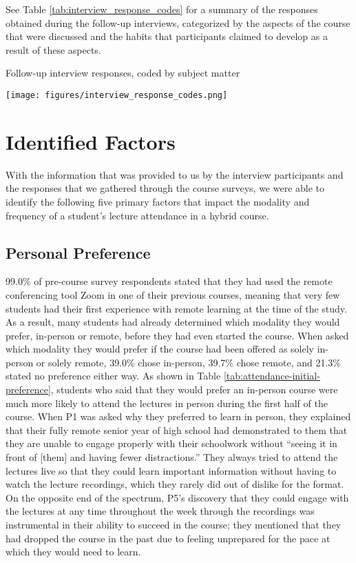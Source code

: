 See Table \ref{tab:interview_response_codes} for a summary of the responses obtained during the follow-up interviews, categorized by the aspects of the course that were discussed and the habits that participants claimed to develop as a result of these aspects.

\begin{table}[H]
    \captionsetup{justification=centering}
    \caption{Follow-up interview responses, coded by subject matter}
    \vspace{5mm}
    \centering
    \texttt{[image: figures/interview\_response\_codes.png]}
    \label{tab:interview_response_codes}
\end{table}

\section{Identified Factors}

With the information that was provided to us by the interview participants and the responses that we gathered through the course surveys, we were able to identify the following five primary factors that impact the modality and frequency of a student’s lecture attendance in a hybrid course.

\subsection{Personal Preference}

99.0\% of pre-course survey respondents stated that they had used the remote conferencing tool Zoom in one of their previous courses, meaning that very few students had their first experience with remote learning at the time of the study. As a result, many students had already determined which modality they would prefer, in-person or remote, before they had even started the course. When asked which modality they would prefer if the course had been offered as solely in-person or solely remote, 39.0\% chose in-person, 39.7\% chose remote, and 21.3\% stated no preference either way. As shown in Table \ref{tab:attendance-initial-preference}, students who said that they would prefer an in-person course were much more likely to attend the lectures in person during the first half of the course. When P1 was asked why they preferred to learn in person, they explained that their fully remote senior year of high school had demonstrated to them that they are unable to engage properly with their schoolwork without “seeing it in front of [them] and having fewer distractions.” They always tried to attend the lectures live so that they could learn important information without having to watch the lecture recordings, which they rarely did out of dislike for the format. On the opposite end of the spectrum, P5’s discovery that they could engage with the lectures at any time throughout the week through the recordings was instrumental in their ability to succeed in the course; they mentioned that they had dropped the course in the past due to feeling unprepared for the pace at which they would need to learn.

